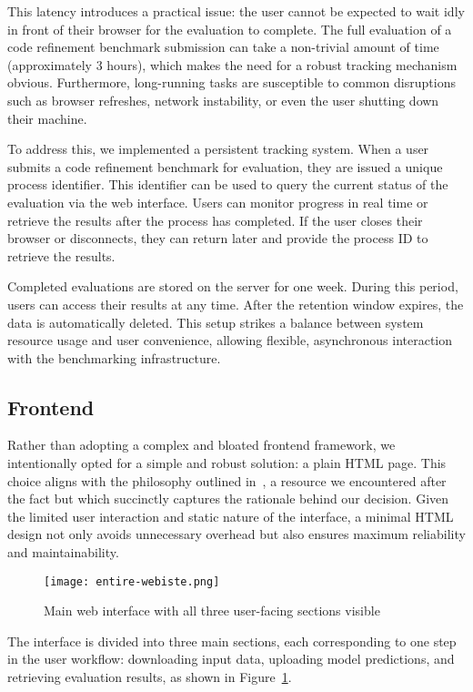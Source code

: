 This latency introduces a practical issue: the user cannot be expected to wait idly in front of
their browser for the evaluation to complete. The full evaluation of a code refinement benchmark
submission can take a non-trivial amount of time (approximately 3 hours), which makes the need for a
robust tracking mechanism obvious. Furthermore, long-running tasks are susceptible to common
disruptions such as browser refreshes, network instability, or even the user shutting down their
machine.

To address this, we implemented a persistent tracking system. When a user submits a code refinement
benchmark for evaluation, they are issued a unique process identifier. This identifier can be used
to query the current status of the evaluation via the web interface. Users can monitor progress in
real time or retrieve the results after the process has completed. If the user closes their browser
or disconnects, they can return later and provide the process ID to retrieve the results.

Completed evaluations are stored on the server for one week. During this period, users can access
their results at any time. After the retention window expires, the data is automatically deleted.
This setup strikes a balance between system resource usage and user convenience, allowing flexible,
asynchronous interaction with the benchmarking infrastructure.

\subsection{Frontend}
\label{sec:frontend}

Rather than adopting a complex and bloated frontend framework, we intentionally opted for a simple
and robust solution: a plain HTML page. This choice aligns with the philosophy outlined
in~\cite{justusehtml}, a resource we encountered after the fact but which succinctly captures the
rationale behind our decision. Given the limited user interaction and static nature of the
interface, a minimal HTML design not only avoids unnecessary overhead but also ensures maximum
reliability and maintainability.

\begin{figure}[H]
	\centering
	\texttt{[image: entire-webiste.png]}
	\caption{Main web interface with all three user-facing sections visible}
	\label{fig:full-page}
\end{figure}

The interface is divided into three main sections, each corresponding to one step in the user
workflow: downloading input data, uploading model predictions, and retrieving evaluation results, as
shown in Figure~\ref{fig:full-page}.

